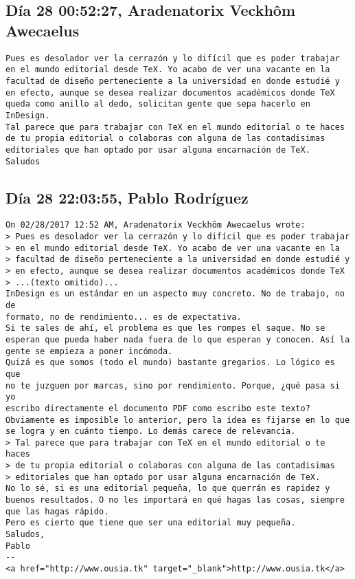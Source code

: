 \documentclass[a4paper,10pt]{article}
\begin{document}
\subsection{Día 28 00:52:27, Aradenatorix Veckhôm Awecaelus}

\begin{lstlisting}
Pues es desolador ver la cerrazón y lo difícil que es poder trabajar
en el mundo editorial desde TeX. Yo acabo de ver una vacante en la
facultad de diseño perteneciente a la universidad en donde estudié y
en efecto, aunque se desea realizar documentos académicos donde TeX
queda como anillo al dedo, solicitan gente que sepa hacerlo en
InDesign.
Tal parece que para trabajar con TeX en el mundo editorial o te haces
de tu propia editorial o colaboras con alguna de las contadisimas
editoriales que han optado por usar alguna encarnación de TeX.
Saludos

\end{lstlisting}

\subsection{Día 28 22:03:55, Pablo Rodríguez}

\begin{lstlisting}
On 02/28/2017 12:52 AM, Aradenatorix Veckhôm Awecaelus wrote:
> Pues es desolador ver la cerrazón y lo difícil que es poder trabajar
> en el mundo editorial desde TeX. Yo acabo de ver una vacante en la
> facultad de diseño perteneciente a la universidad en donde estudié y
> en efecto, aunque se desea realizar documentos académicos donde TeX
> ...(texto omitido)...
InDesign es un estándar en un aspecto muy concreto. No de trabajo, no de
formato, no de rendimiento... es de expectativa.
Si te sales de ahí, el problema es que les rompes el saque. No se
esperan que pueda haber nada fuera de lo que esperan y conocen. Así la
gente se empieza a poner incómoda.
Quizá es que somos (todo el mundo) bastante gregarios. Lo lógico es que
no te juzguen por marcas, sino por rendimiento. Porque, ¿qué pasa si yo
escribo directamente el documento PDF como escribo este texto?
Obviamente es imposible lo anterior, pero la idea es fijarse en lo que
se logra y en cuánto tiempo. Lo demás carece de relevancia.
> Tal parece que para trabajar con TeX en el mundo editorial o te haces
> de tu propia editorial o colaboras con alguna de las contadisimas
> editoriales que han optado por usar alguna encarnación de TeX.
No lo sé, si es una editorial pequeña, lo que querrán es rapidez y
buenos resultados. O no les importará en qué hagas las cosas, siempre
que las hagas rápido.
Pero es cierto que tiene que ser una editorial muy pequeña.
Saludos,
Pablo
-- 
<a href="http://www.ousia.tk" target="_blank">http://www.ousia.tk</a>

\end{lstlisting}
\end{document}

